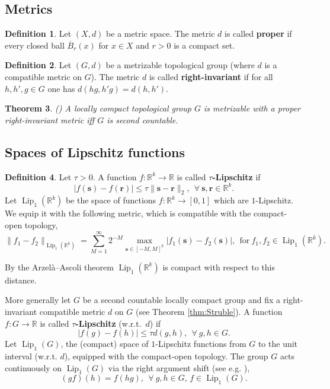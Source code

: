 \documentclass[11pt]{article}
\theoremstyle{plain}
\newtheorem{thm}{Theorem}[section]
\theoremstyle{definition}
\newtheorem{defn}[thm]{Definition}
\DeclareMathOperator{\Lip}{Lip}
\def\R{\mathbb{R}}
\def\ss{\mathbf s}
\numberwithin{figure}{section}
\begin{document}
\subsection{Metrics}
\begin{defn}
Let $(X,d)$ be a metric space. The metric $d$ is called \textbf{proper} if every closed ball $\overline{B}_r(x)$ for $x\in X$ and $r>0$ is a compact set.
\end{defn}

\begin{defn}
Let $(G,d)$ be a metrizable topological group (where $d$ is a compatible metric on $G$). The metric $d$ is called \textbf{right-invariant}  if for all $h,h',g\in G$ one has $d(hg,h'g)=d(h,h')$.
\end{defn}
\begin{thm}\label{thm:Srtuble}(\cite{struble1974metrics})\label{thm:Struble}
    A locally compact topological group $G$ is metrizable with a proper right-invariant metric iff $G$ is second countable.
\end{thm}


\subsection{Spaces of Lipschitz functions}\label{subsec:Lipschitz functions}
\begin{defn}\label{Lip1}
Let $\tau>0$. A function $f:\mathbb{R}^k\to \R$ is called \textbf{$\tau$-Lipschitz} if 
\begin{equation*}
|f(\ss)-f(\mathbf r)|\leq \tau \|\ss-\mathbf r\|_2,~~\forall~\mathbf{s,r}\in\mathbb{R}^k.
\end{equation*}
Let $\Lip_{1}(\mathbb{R}^k)$
be the space of functions $f:\mathbb{R}^k\to[0,1]$ %
which are $1$-Lipschitz.
We equip it with the following metric, which is compatible with the compact-open topology,
\begin{equation*}%
\|f_1-f_2\|_{\Lip_{1}(\mathbb{R}^k)}=\sum\limits_{M=1}^{\infty}2^{-M}\max\limits_{\mathbf s\in[-M,M]^k}|f_1(\ss)-f_2(\ss)|,~~\text{for}~f_1,f_2\in\Lip_{1}(\mathbb{R}^k).
\end{equation*}
\end{defn}

By the Arzel\`{a}--Ascoli theorem $\Lip_{1}(\mathbb{R}^k)$ is compact with respect to this distance. 

More generally let $G$ be a second countable locally compact group and fix a right-invariant compatible metric $d$ on $G$ (see Theorem \ref{thm:Struble}). A function $f:G\to \R$ is called \textbf{$\tau$-Lipschitz} (w.r.t.\ $d$) if 
\begin{equation*}
|f(g)-f(h)|\leq \tau d(g,h),~~\forall~g,h\in G.
\end{equation*}
Let $\Lip_{1}(G)$, the (compact) space of $1$-Lipschitz functions from $G$ to the unit interval (w.r.t. $d$), equipped with the compact-open topology. The group $G$ acts continuously on $\Lip_1(G)$ via the right argument shift (see e.g. \cite[Lemma 1.10]{hjorth1999sharper}), 
$$(gf)(h)=f(hg),~~\forall~g,h\in G,\, f\in \Lip_1(G).$$
\end{document}
